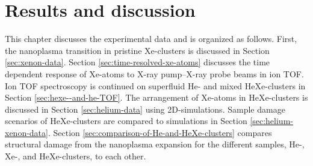 \chapter{Results and discussion}\label{ch:results}
This chapter discusses the experimental data and is organized as follows. First, the nanoplasma transition in pristine Xe-clusters is discussed in Section \ref{sec:xenon-data}. Section \ref{sec:time-resolved-xe-atoms} discusses the time dependent response of Xe-atoms to X-ray pump--X-ray probe beams in ion TOF. Ion TOF spectroscopy is continued on superfluid He- and mixed HeXe-clusters in Section \ref{sec:hexe--and-he-TOF}. The arrangement of Xe-atoms in HeXe-clusters is discussed in Section \ref{sec:helium-data} using 2D-simulations. Sample damage scenarios of HeXe-clusters are compared to simulations in Section \ref{sec:helium-xenon-data}. Section \ref{sec:comparison-of-He-and-HeXe-clusters} compares structural damage from the nanoplasma expansion for the different samples, He-, Xe-, and HeXe-clusters, to each other.
%
%
%
